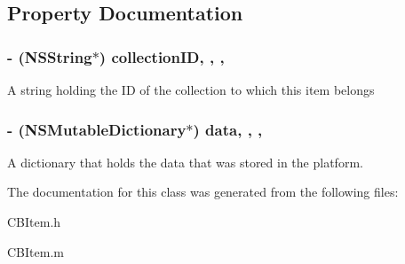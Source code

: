 \subsection{Property Documentation}
\hypertarget{interface_c_b_item_a8d47dba1bcfeb0754b65d312a48a939a}{
\subsubsection[{collection\-I\-D}]{\setlength{\rightskip}{0pt plus 5cm}-\/ (N\-S\-String$\ast$) collection\-I\-D\hspace{0.3cm}{\ttfamily [read]}, {\ttfamily [write]}, {\ttfamily [nonatomic]}, {\ttfamily [strong]}}}\label{interface_c_b_item_a8d47dba1bcfeb0754b65d312a48a939a}
A string holding the I\-D of the collection to which this item belongs \hypertarget{interface_c_b_item_ab9ea1d2d19a9c76e23029bab43b4ba30}{
\subsubsection[{data}]{\setlength{\rightskip}{0pt plus 5cm}-\/ (N\-S\-Mutable\-Dictionary$\ast$) data\hspace{0.3cm}{\ttfamily [read]}, {\ttfamily [write]}, {\ttfamily [nonatomic]}, {\ttfamily [strong]}}}\label{interface_c_b_item_ab9ea1d2d19a9c76e23029bab43b4ba30}
A dictionary that holds the data that was stored in the platform. 

The documentation for this class was generated from the following files\-:\begin{DoxyCompactItemize}
\item 
C\-B\-Item.\-h\item 
C\-B\-Item.\-m\end{DoxyCompactItemize}

